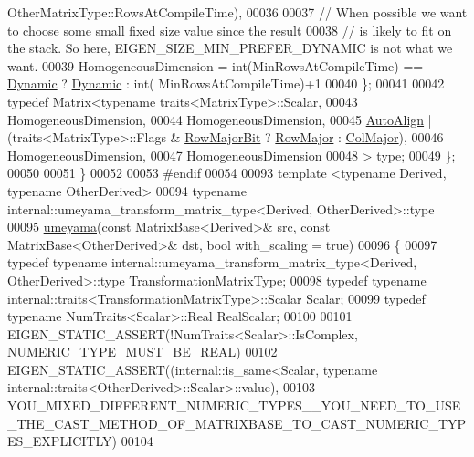 \begin{DoxyCode}
      OtherMatrixType::RowsAtCompileTime),
00036 
00037     \textcolor{comment}{// When possible we want to choose some small fixed size value since the result}
00038     \textcolor{comment}{// is likely to fit on the stack. So here, EIGEN\_SIZE\_MIN\_PREFER\_DYNAMIC is not what we want.}
00039     HomogeneousDimension = int(MinRowsAtCompileTime) == \hyperlink{namespace_eigen_ad81fa7195215a0ce30017dfac309f0b2}{Dynamic} ? \hyperlink{namespace_eigen_ad81fa7195215a0ce30017dfac309f0b2}{Dynamic} : int(
      MinRowsAtCompileTime)+1
00040   \};
00041 
00042   \textcolor{keyword}{typedef} Matrix<typename traits<MatrixType>::Scalar,
00043     HomogeneousDimension,
00044     HomogeneousDimension,
00045     \hyperlink{group__enums_ggaacded1a18ae58b0f554751f6cdf9eb13a28d63c0dd8560827162decfd898804f4}{AutoAlign} | (traits<MatrixType>::Flags & \hyperlink{group__flags_gae4f56c2a60bbe4bd2e44c5b19cbe8762}{RowMajorBit} ? 
      \hyperlink{group__enums_ggaacded1a18ae58b0f554751f6cdf9eb13acfcde9cd8677c5f7caf6bd603666aae3}{RowMajor} : \hyperlink{group__enums_ggaacded1a18ae58b0f554751f6cdf9eb13a0cbd4bdd0abcfc0224c5fcb5e4f6669a}{ColMajor}),
00046     HomogeneousDimension,
00047     HomogeneousDimension
00048   > type;
00049 \};
00050 
00051 \}
00052 
00053 \textcolor{preprocessor}{#endif}
00054 
00093 \textcolor{keyword}{template} <\textcolor{keyword}{typename} Derived, \textcolor{keyword}{typename} OtherDerived>
00094 \textcolor{keyword}{typename} internal::umeyama\_transform\_matrix\_type<Derived, OtherDerived>::type
00095 \hyperlink{group___geometry___module_ga033d6550c1fc82e232f2b4c380c19a54}{umeyama}(\textcolor{keyword}{const} MatrixBase<Derived>& src, \textcolor{keyword}{const} MatrixBase<OtherDerived>& dst, \textcolor{keywordtype}{bool} with\_scaling = \textcolor{keyword}{
      true})
00096 \{
00097   \textcolor{keyword}{typedef} \textcolor{keyword}{typename} internal::umeyama\_transform\_matrix\_type<Derived, OtherDerived>::type 
      TransformationMatrixType;
00098   \textcolor{keyword}{typedef} \textcolor{keyword}{typename} internal::traits<TransformationMatrixType>::Scalar Scalar;
00099   \textcolor{keyword}{typedef} \textcolor{keyword}{typename} NumTraits<Scalar>::Real RealScalar;
00100 
00101   EIGEN\_STATIC\_ASSERT(!NumTraits<Scalar>::IsComplex, NUMERIC\_TYPE\_MUST\_BE\_REAL)
00102   EIGEN\_STATIC\_ASSERT((internal::is\_same<Scalar, \textcolor{keyword}{typename} internal::traits<OtherDerived>::Scalar>::value),
00103     
      YOU\_MIXED\_DIFFERENT\_NUMERIC\_TYPES\_\_YOU\_NEED\_TO\_USE\_THE\_CAST\_METHOD\_OF\_MATRIXBASE\_TO\_CAST\_NUMERIC\_TYPES\_EXPLICITLY)
00104 

\end{DoxyCode}
